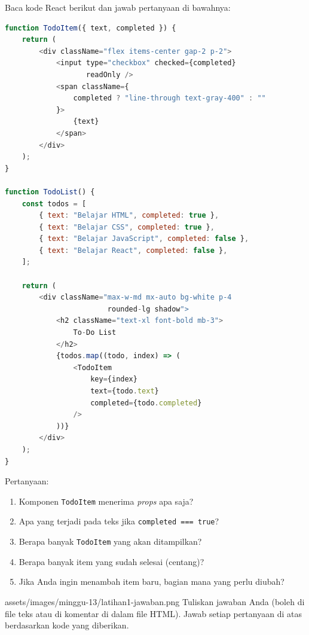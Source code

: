 \begin{latihan}
Baca kode React berikut dan jawab pertanyaan di bawahnya:

\begin{lstlisting}[language=JavaScript, label={lst:13-latihan-kode}]
function TodoItem({ text, completed }) {
    return (
        <div className="flex items-center gap-2 p-2">
            <input type="checkbox" checked={completed}
                   readOnly />
            <span className={
                completed ? "line-through text-gray-400" : ""
            }>
                {text}
            </span>
        </div>
    );
}

function TodoList() {
    const todos = [
        { text: "Belajar HTML", completed: true },
        { text: "Belajar CSS", completed: true },
        { text: "Belajar JavaScript", completed: false },
        { text: "Belajar React", completed: false },
    ];

    return (
        <div className="max-w-md mx-auto bg-white p-4
                        rounded-lg shadow">
            <h2 className="text-xl font-bold mb-3">
                To-Do List
            </h2>
            {todos.map((todo, index) => (
                <TodoItem
                    key={index}
                    text={todo.text}
                    completed={todo.completed}
                />
            ))}
        </div>
    );
}
\end{lstlisting}

Pertanyaan:
\begin{enumerate}
  \item Komponen \texttt{TodoItem} menerima \emph{props} apa saja?
  \item Apa yang terjadi pada teks jika \texttt{completed === true}?
  \item Berapa banyak \texttt{TodoItem} yang akan ditampilkan?
  \item Berapa banyak item yang sudah selesai (centang)?
  \item Jika Anda ingin menambah item baru, bagian mana yang perlu diubah?
\end{enumerate}

\begin{tangkapanlayar}
  {assets/images/minggu-13/latihan1-jawaban.png}
  {Tuliskan jawaban Anda (boleh di file teks atau di komentar di dalam file HTML).}
  {Jawab setiap pertanyaan di atas berdasarkan kode yang diberikan.}
\end{tangkapanlayar}
\end{latihan}

